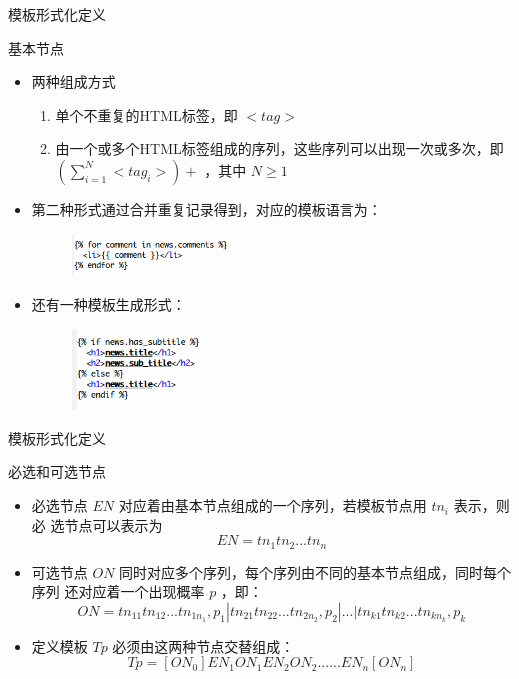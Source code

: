\documentclass[presentation]{beamer}
\begin{document}
\begin{frame}[label=sec-2-15]{模板形式化定义}
\begin{block}{基本节点}
\begin{itemize}
\item 两种组成方式 
\begin{enumerate}
\item 单个不重复的HTML标签，即 $<tag>$
\item 由一个或多个HTML标签组成的序列，这些序列可以出现一次或多次，即
         $(\sum_{i=1}^N<tag_i>)+$ ，其中 $N \ge 1$
\end{enumerate}
\item 第二种形式通过合并重复记录得到，对应的模板语言为：
\begin{figure}[hb]
\centering
\includegraphics[width=0.4\textwidth]{django-for}
\end{figure}
\item 还有一种模板生成形式：
\begin{figure}[hb]
\centering
\includegraphics[width=0.35\textwidth]{django-if}
\end{figure}
\end{itemize}
\end{block}
\end{frame}
\begin{frame}[label=sec-2-16]{模板形式化定义}
\begin{block}{必选和可选节点}
\begin{itemize}
\item 必选节点 $EN$ 对应着由基本节点组成的一个序列，若模板节点用 $tn_i$ 表示，则必
选节点可以表示为
\[
      EN=tn_1tn_2...tn_n
      \]
\item 可选节点 $ON$ 同时对应多个序列，每个序列由不同的基本节点组成，同时每个序列
还对应着一个出现概率 $p$ ，即：
\[
      ON=tn_{11}tn_{12}...tn_{1n_1},p_1|tn_{21}tn_{22}...tn_{2n_2},p_2|...|tn_{k1}tn_{k2}...tn_{kn_k},p_k
      \]
\item 定义模板 $Tp$ 必须由这两种节点交替组成：
      \[
      Tp=[ON_0]EN_1ON_1EN_2ON_2......EN_n[ON_n] 
      \]
\end{itemize}
\end{block}
\end{frame}
\end{document}
